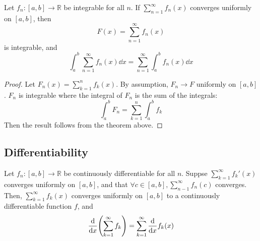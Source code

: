 \begin{corollary}
	Let \( f_n \colon [a,b] \to \mathbb R \) be integrable for all \( n \).
	If \( \sum_{n=1}^\infty f_n(x) \) converges uniformly on \( [a,b] \), then
	\[
		F(x) = \sum_{n=1}^\infty f_n(x)
	\]
	is integrable, and
	\[
		\int_a^b \sum_{n=1}^\infty f_n(x) \dd{x} = \sum_{n=1}^\infty \int_a^b f_n(x) \dd{x}
	\]
\end{corollary}
\begin{proof}
	Let \( F_n(x) = \sum_{k=1}^n f_k(x) \).
	By assumption, \( F_n \to F \) uniformly on \( [a,b] \).
	\( F_n \) is integrable where the integral of \( F_n \) is the sum of the integrals:
	\[
		\int_a^b F_n = \sum_{k=1}^n \int_a^b f_k
	\]
	Then the result follows from the theorem above.
\end{proof}

\subsection{Differentiability}
\begin{theorem}
	Let \( f_n \colon [a,b] \to \mathbb R \) be continuously differentiable for all \( n \).
	Suppse \( \sum_{k=1}^\infty f_k'(x) \) converges uniformly on \( [a,b] \), and that \( \forall c \in [a,b], \sum_{n-1}^\infty f_n(c) \) converges.
	Then, \( \sum_{k=1}^\infty f_k(x) \) converges uniformly on \( [a,b] \) to a continuously differentiable function \( f \), and
	\[
		\dv{x} \qty(\sum_{k=1}^\infty f_k) = \sum_{k=1}^\infty \dv{x} f_k(x)
	\]
\end{theorem}
